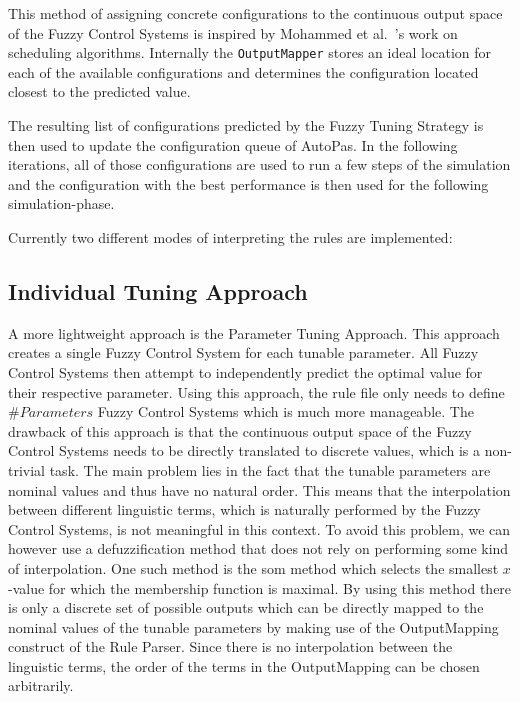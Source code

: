 This method of assigning concrete configurations to the continuous output space of the Fuzzy Control Systems is inspired by Mohammed et al.~\cite{Mohammed2022}'s work on scheduling algorithms. Internally the \texttt{OutputMapper} stores an ideal location for each of the available configurations and determines the configuration located closest to the predicted value.

The resulting list of configurations predicted by the Fuzzy Tuning Strategy is then used to update the configuration queue of AutoPas. In the following iterations, all of those configurations are used to run a few steps of the simulation and the configuration with the best performance is then used for the following simulation-phase.

Currently two different modes of interpreting the rules are implemented:

\subsection{Individual Tuning Approach}

A more lightweight approach is the Parameter Tuning Approach. This approach creates a single Fuzzy Control System for each tunable parameter. All Fuzzy Control Systems then attempt to independently predict the optimal value for their respective parameter. Using this approach, the rule file only needs to define $\#Parameters$ Fuzzy Control Systems which is much more manageable. The drawback of this approach is that the continuous output space of the Fuzzy Control Systems needs to be directly translated to discrete values, which is a non-trivial task. The main problem lies in the fact that the tunable parameters are nominal values and thus have no natural order. This means that the interpolation between different linguistic terms, which is naturally performed by the Fuzzy Control Systems, is not meaningful in this context. To avoid this problem, we can however use a defuzzification method that does not rely on performing some kind of interpolation. One such method is the \gls{som} method which selects the smallest $x$-value for which the membership function is maximal. By using this method there is only a discrete set of possible outputs which can be directly mapped to the nominal values of the tunable parameters by making use of the OutputMapping construct of the Rule Parser. Since there is no interpolation between the linguistic terms, the order of the terms in the OutputMapping can be chosen arbitrarily.

